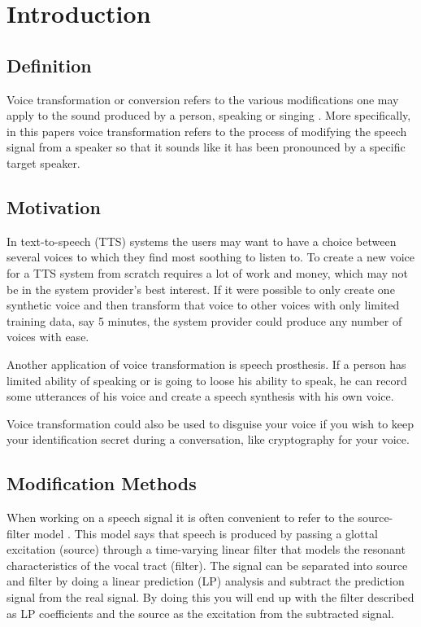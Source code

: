 \chapter{Introduction} %
\label{cha:introduction}
  

\section{Definition} %
\label{sec:definition}
Voice transformation or conversion refers to the various modifications one may apply to the sound produced by a person, speaking or singing \cite{stylianou08}. More specifically, in this papers voice transformation refers to the process of modifying the speech signal from a speaker so that it sounds like it has been pronounced by a specific target speaker. 

\section{Motivation} %
\label{sec:motivation}
In text-to-speech (TTS) systems the users may want to have a choice between several voices to which they find most soothing to listen to. To create a new voice for a TTS system from scratch requires a lot of work and money, which may not be in the system provider's best interest. If it were possible to only create one synthetic voice and then transform that voice to other voices with only limited training data, say 5 minutes, the system provider could produce any number of voices with ease. 

Another application of voice transformation is speech prosthesis. If a person has limited ability of speaking or is going to loose his ability to speak, he can record some utterances of his voice and create a speech synthesis with his own voice.
 
Voice transformation could also be used to disguise your voice if you wish to keep your identification secret during a conversation, like cryptography for your voice. 

\section{Modification Methods} %
\label{sec:synthesis_methods}
When working on a speech signal it is often convenient to refer to the source-filter model \cite{taletek}. This model says that speech is produced by passing a glottal excitation (source) through a time-varying linear filter that models the resonant characteristics of the vocal tract (filter). The signal can be separated into source and filter by doing a linear prediction (LP) analysis and subtract the prediction signal from the real signal. By doing this you will end up with the filter described as LP coefficients and the source as the excitation from the subtracted signal.

